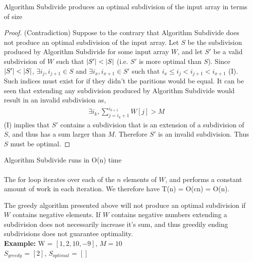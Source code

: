 \documentclass[12pt]{article}
\newenvironment{lemma}[2][Lemma]{\begin{trivlist}
\item[\hskip \labelsep {\bfseries #1}\hskip \labelsep {\bfseries #2.}]}{\end{trivlist}}
\newenvironment{question}[2][Question]{\begin{trivlist}
\item[\hskip \labelsep {\bfseries #1}\hskip \labelsep {\bfseries #2.}]}{\end{trivlist}}
\DeclarePairedDelimiter\abs{\lvert}{\rvert}%
\begin{document}
\begin{question}{1 (a)}
  \pagebreak
  \begin{lemma}{1.2} Algorithm Subdivide produces an optimal subdivision of the
                     input array in terms of size
    \begin{proof} (Contradiction)
      Suppose to the contrary that Algorithm Subdivide does not produce an optimal
      subdivision of the input array. Let $S$ be the subdivision produced by
      Algorithm Subdivide for some input array $W$, and let $S'$ be a valid
      subdivision of $W$ such that $\abs{S'} < \abs{S}$ (i.e. $S'$ is more
      optimal than $S$).  Since $\abs{S'} < \abs{S}$, $\exists i_{j}, i_{j+1} \in S$
      and $\exists i_{x}, i_{x+1} \in S'$ such that $i_{x} \leq i_{j} < i_{j+1} < i_{x+1}$ (I).
      Such indices must exist for if they didn't the paritions would be equal.
      It can be seen that extending any subdivision produced by Algorithm Subdivide
      would result in an invalid subdivision as,
      \begin{align*}
        \exists i_{k}, \sum_{j=i_{k}+1}^{i_{k+1}} W[j] > M
      \end{align*}
      (I) implies that $S'$ contains a subdivision that is an extension of
      a subdivision of $S$, and thus has a sum larger than $M$.  Therefore $S'$
      is an invalid subdivision.  Thus $S$ must be optimal.
    \end{proof}
  \end{lemma}

  \begin{lemma}{1.3} Algorithm Subdivide runs in O(n) time
    \leavevmode \\ \\
    The for loop iterates over each of the $n$ elements of $W$, and performs
    a constant amount of work in each iteration.  We therefore have T(n) = O(cn) = O(n).
  \end{lemma}
\end{question}

\begin{question}{1 (b)}
  The greedy algorithm presented above will not produce an optimal subdivision
  if $W$ contains negative elements.  If $W$ contains negative numbers extending
  a subdivision does not necessarily increase it's sum, and thus greedily ending
  subdivisions does not guarantee optimality. \\

  \textbf{Example:}
  W = $[1, 2, 10, -9]$, $M = 10$ \\
  $S_{greedy}$ = $[2]$, $S_{optimal}$ = $[]$ \\
\end{question}
\end{document}
